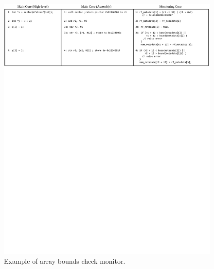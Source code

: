 % 

\begin{figure}
  \begin{center}
    \includegraphics[]{figs/example_full.pdf}
    \vspace{-0.2in}
    \caption{Example of array bounds check monitor.}
    \label{fig:monitoring.example_full}
    \vspace{-0.1in}
  \end{center}
\end{figure} 

